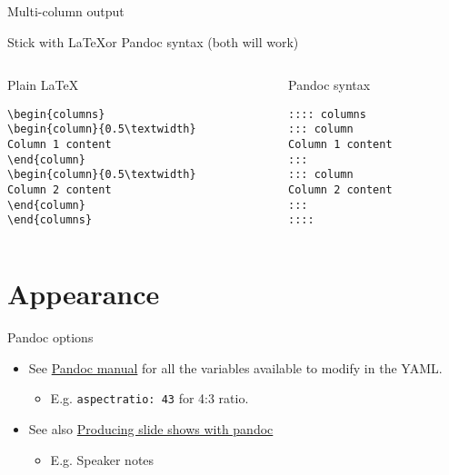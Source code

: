 \documentclass[10pt,aspectratio=169]{beamer}
\begin{document}
\begin{frame}[fragile]{Multi-column output}

Stick with \LaTeX or Pandoc syntax (both will work)

\begin{columns}[T]
\begin{column}{0.48\textwidth}
\begin{block}{Plain \LaTeX}

\begin{verbatim}
\begin{columns}
\begin{column}{0.5\textwidth}
Column 1 content
\end{column}
\begin{column}{0.5\textwidth}
Column 2 content
\end{column}
\end{columns}
\end{verbatim}

\end{block}
\end{column}

\begin{column}{0.48\textwidth}
\begin{block}{Pandoc syntax}

\begin{verbatim}
:::: columns
::: column
Column 1 content
:::
::: column
Column 2 content
:::
::::
\end{verbatim}

\end{block}
\end{column}
\end{columns}

\end{frame}


\section{Appearance}

\begin{frame}[fragile]{Pandoc options}

\begin{itemize}
\item
  See
  \href{https://pandoc.org/MANUAL.html\#variables-for-beamer-slides}{Pandoc
  manual} for all the variables available to modify in the YAML.

  \begin{itemize}
  \item
    E.g. \texttt{aspectratio:\ 43} for 4:3 ratio.
  \end{itemize}
\item
  See also
  \href{https://pandoc.org/MANUAL.html\#producing-slide-shows-with-pandoc}{Producing
  slide shows with pandoc}

  \begin{itemize}
  \item
    E.g. Speaker notes
  \end{itemize}
\end{itemize}

\end{frame}
\end{document}
